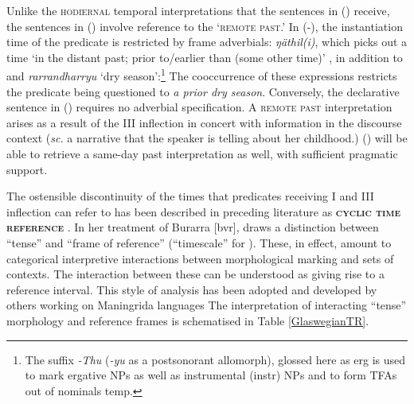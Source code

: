 Unlike the \textsc{hodiernal} temporal interpretations that the sentences in (\blastx) receive, the sentences in (\lastx) involve reference to the `\textsc{remote past}.' In (-),%
 the instantiation time of the predicate is restricted by frame adverbials: \textit{ŋäthil(i)}, which picks out a time `in the distant past; prior to/earlier than (some other time)' \citep[158]{Wilkinson1991}, in addition to and \textit{rarrandharryu} `dry season':\footnote{The suffix \textit{-Thu} (\textit{-yu} as a postsonorant allomorph), glossed here as \gls{erg} is used to mark ergative NPs as well as instrumental (\gls{instr}) NPs and to form TFAs out of nominals \gls{temp}.} The cooccurrence of these expressions restricts the predicate being questioned to \textit{a prior dry season}. Conversely, the declarative sentence in () requires no adverbial specification. A \textsc{remote past} interpretation arises as a result of the \gls{III} inflection in concert with information in the discourse context (\textit{sc.} a narrative that the speaker is telling about her childhood.) () will be able to retrieve a same-day past interpretation as well, with sufficient pragmatic support.

The ostensible discontinuity of the times that predicates receiving \gls{I} and \gls{III} inflection can refer to has been described in preceding literature as \textbf{\textsc{cyclic time reference}} \citep[88]{Comrie1983}. In her treatment of Burarra [\gls{bvr}], \citet{Glasgow1964} draws a distinction between ``tense'' and ``frame of reference'' (``timescale'' for \citealt[48]{Green1987}). These, in effect, amount to categorical interpretive interactions between morphological marking and sets of contexts. The interaction between these can be understood as giving rise to a reference interval. This style of analysis has been adopted and developed by others working on Maningrida languages \citetext{\citealt[165]{Eather2011} for Nakkara [\gls{nck}], \citet{Green1995} for Gurr-goni [\gls{gge}] and \citet{McKay2000} for Ndjébanna [\gls{djj}].} The interpretation of interacting ``tense'' morphology and reference frames is schematised in Table \ref{GlaswegianTR}. 



